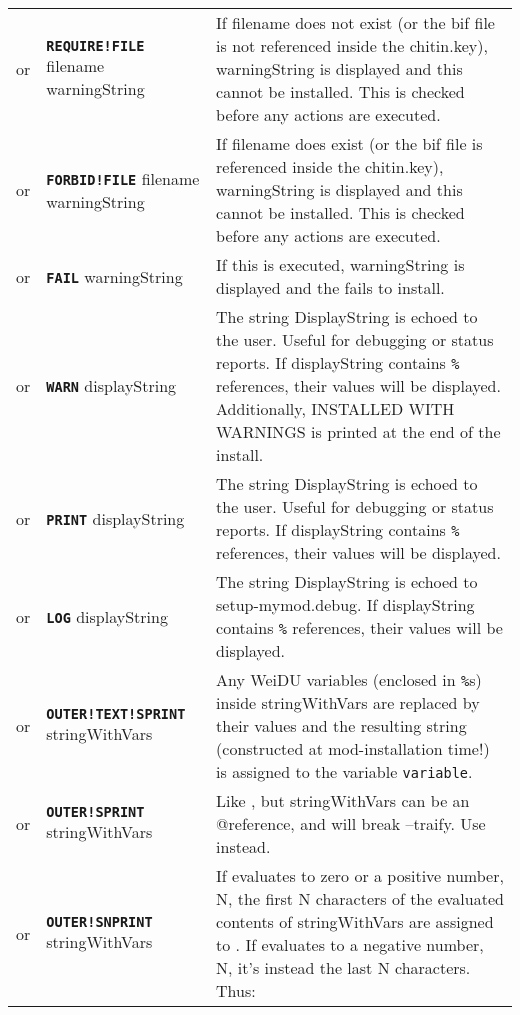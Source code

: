 \documentclass{article}
\def\ttref#1{\ahrefloc{#1}{\tt #1}}
\def\DEFINE#1{{\tt \bf #1}\label{#1}\index{#1}}
\def\t#1{{\tt #1}}
\begin{document}
\begin{tabular}{cp{10in}|p{10in}}
  or & \DEFINE{REQUIRE!FILE} filename warningString &
    If filename does not exist (or the bif file is not referenced inside
    the chitin.key), warningString is displayed and this
    \ttref{component} cannot be installed. This is checked before any
    actions are executed. \\
  or & \DEFINE{FORBID!FILE} filename warningString &
    If filename does exist (or the bif file is referenced inside
    the chitin.key), warningString is displayed and this
    \ttref{component} cannot be installed. This is checked before any
    actions are executed. \\
  or & \DEFINE{FAIL} warningString &
    If this \ttref{TP2 Action} is executed, warningString is displayed and
    the \ttref{component} fails to install. \\
  or & \DEFINE{WARN} displayString &
    The string DisplayString is echoed to the user. Useful for debugging or
    status reports. If displayString contains \t{\%}\ttref{variable}\t{\%}
    references, their values will be displayed. Additionally, INSTALLED WITH
    WARNINGS is printed at the end of the install.
    \\
  or & \DEFINE{PRINT} displayString &
    The string DisplayString is echoed to the user. Useful for debugging or
    status reports. If displayString contains \t{\%}\ttref{variable}\t{\%}
    references, their values will be displayed. \\
  or & \DEFINE{LOG} displayString &
    The string DisplayString is echoed to setup-mymod.debug.
    If displayString contains \t{\%}\ttref{variable}\t{\%}
    references, their values will be displayed. \\
or & \DEFINE{OUTER!TEXT!SPRINT} \ttref{variable} stringWithVars &
  Any WeiDU variables (enclosed in \t{\%}s) inside stringWithVars are
  replaced by their values and the resulting string (constructed at
  mod-installation time!) is assigned to the variable \t{variable}. \\
or & \DEFINE{OUTER!SPRINT} \ttref{variable} stringWithVars &
  Like \ttref{OUTER!TEXT!SPRINT}, but stringWithVars can be an @reference, and will
  break --traify. Use \ttref{OUTER!TEXT!SPRINT} instead. \\
or & \DEFINE{OUTER!SNPRINT} \ttref{value} \ttref{variable} stringWithVars &
  If \ttref{value} evaluates to zero or a positive number, N, the first
  N characters of the evaluated contents of stringWithVars are
  assigned to \ttref{variable}. If \ttref{value} evaluates to a
  negative number, N, it's instead the last N characters. Thus:

\end{tabular}
\end{document}
